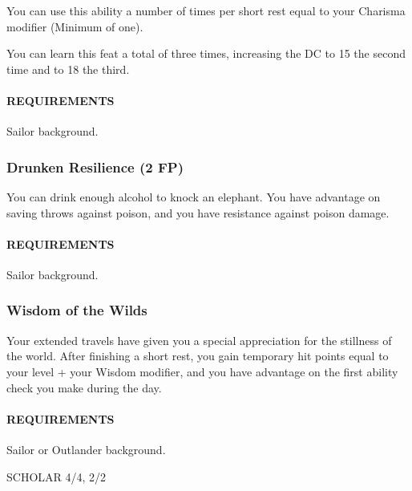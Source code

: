         You can use this ability a number of times per short rest equal to your Charisma modifier (Minimum of one).

        You can learn this feat a total of three times, increasing the DC to 15 the second time and to 18 the third.
        \paragraph{REQUIREMENTS} Sailor background.

    \subsubsection{Drunken Resilience (2 FP)} \label{feat::drunkenresilience}
        You can drink enough alcohol to knock an elephant.
        You have advantage on saving throws against poison, and you have resistance against poison damage.
        \paragraph{REQUIREMENTS} Sailor background.

    \subsubsection{Wisdom of the Wilds} \label{feat::wisdomofthewilds}
        Your extended travels have given you a special appreciation for the stillness of the world.
        After finishing a short rest, you gain temporary hit points equal to your level + your Wisdom modifier, and you have advantage on the first ability check you make during the day.
        \paragraph{REQUIREMENTS} Sailor or Outlander background.

SCHOLAR 4/4, 2/2

